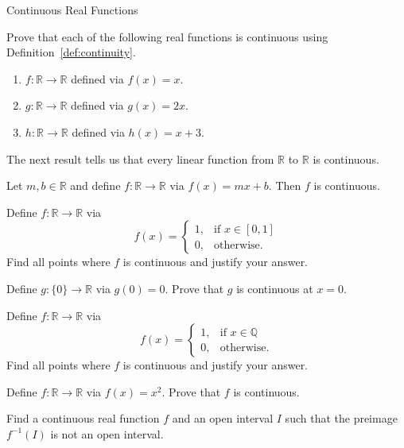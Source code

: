 \begin{section}{Continuous Real Functions}
\begin{problem}
Prove that each of the following real functions is continuous using Definition~\ref{def:continuity}.
\begin{enumerate}[label=\textrm{(\alph*)}]
\item $f:\mathbb{R}\to \mathbb{R}$ defined via $f(x)=x$.
\item $g:\mathbb{R}\to \mathbb{R}$ defined via $g(x)=2x$.
\item $h:\mathbb{R}\to \mathbb{R}$ defined via $h(x)=x+3$.
\end{enumerate}
\end{problem}

The next result tells us that every linear function from $\mathbb{R}$ to $\mathbb{R}$ is continuous.

\begin{theorem}
Let $m,b\in\mathbb{R}$ and define $f:\mathbb{R}\to\mathbb{R}$ via $f(x)=mx+b$. Then $f$ is continuous.
\end{theorem}

\begin{problem}
Define $f:\mathbb{R}\to\mathbb{R}$ via 
\[
f(x)=\begin{cases}
1, & \text{if }x\in[0,1]\\
0, & \text{otherwise}.
\end{cases}
\]
Find all points where $f$ is continuous and justify your answer.
\end{problem}

\begin{problem}
Define $g:\{0\}\to \mathbb{R}$ via $g(0)=0$.  Prove that $g$ is continuous at $x=0$.
\end{problem}

\begin{problem}
Define $f:\mathbb{R}\to\mathbb{R}$ via 
\[
f(x)=\begin{cases}
1, & \text{if }x\in \mathbb{Q}\\
0, & \text{otherwise}.
\end{cases}
\]
Find all points where $f$ is continuous and justify your answer.
\end{problem}

\begin{problem}
Define $f:\mathbb{R}\to\mathbb{R}$ via $f(x)=x^2$. Prove that $f$ is continuous.
\end{problem}

\begin{problem}
Find a continuous real function $f$ and an open interval $I$ such that the preimage $f^{-1}(I)$ is not an open interval.
\end{problem}


\end{section}
